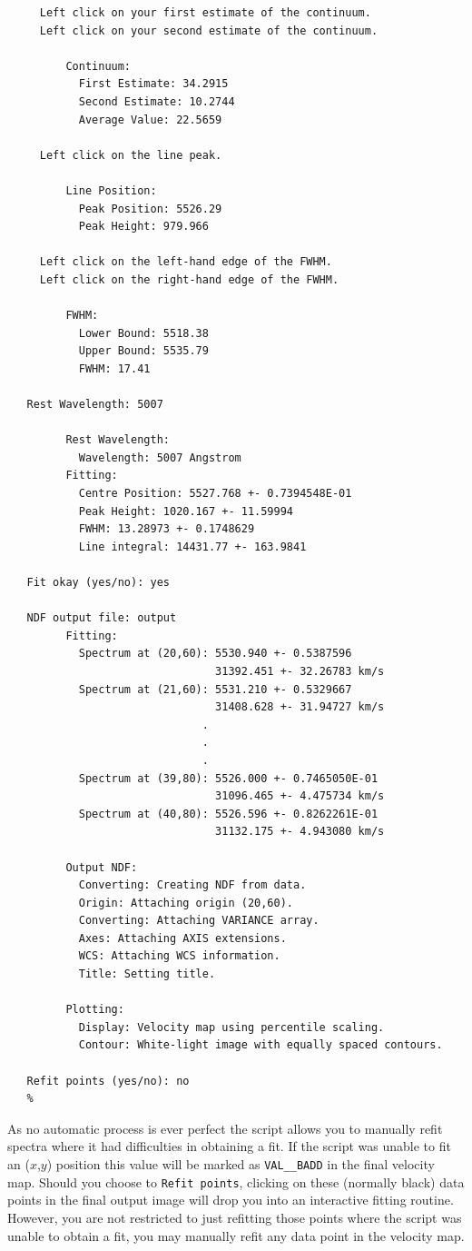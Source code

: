 \documentclass[twoside,11pt]{article}
\begin{document}
{\begin{verbatim}
     Left click on your first estimate of the continuum.
     Left click on your second estimate of the continuum.
 
         Continuum:
           First Estimate: 34.2915
           Second Estimate: 10.2744
           Average Value: 22.5659
 
     Left click on the line peak.
  
         Line Position:
           Peak Position: 5526.29
           Peak Height: 979.966
 
     Left click on the left-hand edge of the FWHM.
     Left click on the right-hand edge of the FWHM.
 
         FWHM:
           Lower Bound: 5518.38
           Upper Bound: 5535.79
           FWHM: 17.41
 
   Rest Wavelength: 5007
 
         Rest Wavelength:
           Wavelength: 5007 Angstrom
         Fitting:
           Centre Position: 5527.768 +- 0.7394548E-01
           Peak Height: 1020.167 +- 11.59994
           FWHM: 13.28973 +- 0.1748629
           Line integral: 14431.77 +- 163.9841
 
   Fit okay (yes/no): yes
 
   NDF output file: output
         Fitting:
           Spectrum at (20,60): 5530.940 +- 0.5387596
                                31392.451 +- 32.26783 km/s
           Spectrum at (21,60): 5531.210 +- 0.5329667
                                31408.628 +- 31.94727 km/s
                              .
                              .
                              .
           Spectrum at (39,80): 5526.000 +- 0.7465050E-01
                                31096.465 +- 4.475734 km/s
           Spectrum at (40,80): 5526.596 +- 0.8262261E-01
                                31132.175 +- 4.943080 km/s
 
         Output NDF:
           Converting: Creating NDF from data.
           Origin: Attaching origin (20,60).
           Converting: Attaching VARIANCE array.
           Axes: Attaching AXIS extensions.
           WCS: Attaching WCS information.
           Title: Setting title.

         Plotting:
           Display: Velocity map using percentile scaling.
           Contour: White-light image with equally spaced contours.
 
   Refit points (yes/no): no
   %
\end{verbatim}\normalsize

As no automatic process is ever perfect the script allows you to
manually refit spectra where it had difficulties in obtaining a fit.
If the script was unable to fit an ($x$,$y$) position this value will be
marked as {\tt VAL\_\_BADD} in the final velocity map.  Should you choose
to {\tt Refit points}, clicking on these (normally black) data points in
the final output image will drop you into an interactive fitting
routine.  However, you are not restricted to just refitting those points
where the script was unable to obtain a fit, you may manually refit
any data point in the velocity map.

}
\end{document}
